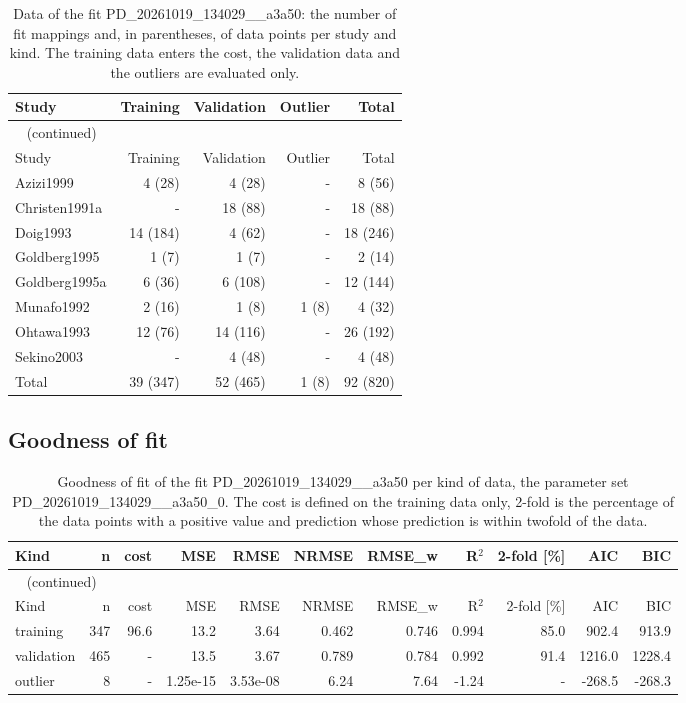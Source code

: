 \documentclass{article}
\begin{document}
\begin{longtable}{lrrrr}
\caption{Data of the fit PD\_20261019\_134029\_\_a3a50: the number of fit mappings and, in parentheses, of data points per study and kind. The training data enters the cost, the validation data and the outliers are evaluated only.}\label{tab:data:PD_20261019_134029__a3a50} \\
\toprule
Study & Training & Validation & Outlier & Total \\
\midrule
\endfirsthead
\multicolumn{5}{l}{\small\tablename~\thetable{} (continued)} \\
\toprule
Study & Training & Validation & Outlier & Total \\
\midrule
\endhead
\bottomrule
\endlastfoot
Azizi1999 & 4 (28) & 4 (28) & - & 8 (56) \\
Christen1991a & - & 18 (88) & - & 18 (88) \\
Doig1993 & 14 (184) & 4 (62) & - & 18 (246) \\
Goldberg1995 & 1 (7) & 1 (7) & - & 2 (14) \\
Goldberg1995a & 6 (36) & 6 (108) & - & 12 (144) \\
Munafo1992 & 2 (16) & 1 (8) & 1 (8) & 4 (32) \\
Ohtawa1993 & 12 (76) & 14 (116) & - & 26 (192) \\
Sekino2003 & - & 4 (48) & - & 4 (48) \\
Total & 39 (347) & 52 (465) & 1 (8) & 92 (820) \\
\end{longtable}

\subsection{Goodness of fit}

\begin{longtable}{lrrrrrrrrrr}
\caption{Goodness of fit of the fit PD\_20261019\_134029\_\_a3a50 per kind of data, the parameter set PD\_20261019\_134029\_\_a3a50\_0. The cost is defined on the training data only, 2-fold is the percentage of the data points with a positive value and prediction whose prediction is within twofold of the data.}\label{tab:metrics:PD_20261019_134029__a3a50} \\
\toprule
Kind & n & cost & MSE & RMSE & NRMSE & RMSE\_w & R\ensuremath{^{2}} & 2-fold [\%] & AIC & BIC \\
\midrule
\endfirsthead
\multicolumn{11}{l}{\small\tablename~\thetable{} (continued)} \\
\toprule
Kind & n & cost & MSE & RMSE & NRMSE & RMSE\_w & R\ensuremath{^{2}} & 2-fold [\%] & AIC & BIC \\
\midrule
\endhead
\bottomrule
\endlastfoot
training & 347 & 96.6 & 13.2 & 3.64 & 0.462 & 0.746 & 0.994 & 85.0 & 902.4 & 913.9 \\
validation & 465 & - & 13.5 & 3.67 & 0.789 & 0.784 & 0.992 & 91.4 & 1216.0 & 1228.4 \\
outlier & 8 & - & 1.25e-15 & 3.53e-08 & 6.24 & 7.64 & -1.24 & - & -268.5 & -268.3 \\
\end{longtable}
\end{document}
